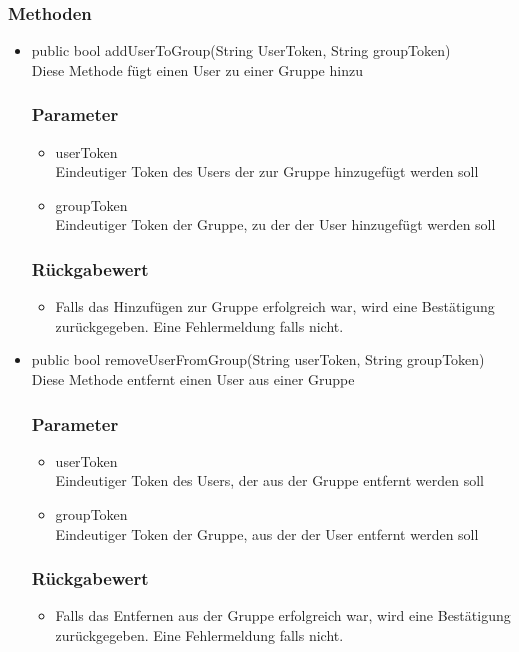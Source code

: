 \documentclass[a4paper]{scrreprt}
\begin{document}
\subsubsection*{Methoden}
\begin{addmargin}[25pt]{0pt}
\begin{itemize}

\item public bool addUserToGroup(String UserToken, String groupToken)\\
	Diese Methode fügt einen User zu einer Gruppe hinzu
	\subsubsection*{Parameter}
	\begin{itemize}
	\item userToken \\
		Eindeutiger Token des Users der zur Gruppe hinzugefügt werden soll
	\item groupToken \\
		Eindeutiger Token der Gruppe, zu der der User hinzugefügt werden soll
	\end{itemize}
	\subsubsection*{Rückgabewert}
	\begin{itemize}
	\item Falls das Hinzufügen zur Gruppe erfolgreich war, wird eine Bestätigung zurückgegeben. Eine Fehlermeldung falls nicht.
	\end{itemize}
	
\item public bool removeUserFromGroup(String userToken, String groupToken)\\
	Diese Methode entfernt einen User aus einer Gruppe
	\subsubsection*{Parameter}
	\begin{itemize}
	\item userToken \\
		Eindeutiger Token des Users, der aus der Gruppe entfernt werden soll
	\item groupToken \\
		Eindeutiger Token der Gruppe, aus der der User entfernt werden soll
	\end{itemize}
	\subsubsection*{Rückgabewert}
	\begin{itemize}
	\item Falls das Entfernen aus der Gruppe erfolgreich war, wird eine Bestätigung zurückgegeben. Eine Fehlermeldung falls nicht.
	\end{itemize}
\end{itemize}
\end{addmargin}
\end{document}
